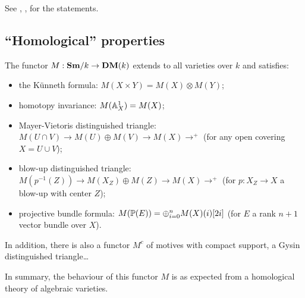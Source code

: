 See \cite[2.2]{voevodsky00-mm}, \cite[14]{MVW-motcoh},
\cite[18]{andre04-motifs} for the statements.


\subsection{``Homological'' properties}

\begin{thm}
  The functor $M:\mathbf{Sm}/k\to\mathbf{DM}(k)$ extends to all varieties over $k$ and
  satisfies:
  \begin{itemize}
  \item the Künneth formula: $M(X\times Y)= M(X)\otimes M(Y)$;
  \item homotopy invariance: $M(\mathbb{A}^{1}_{X})=M(X)$;
  \item Mayer-Vietoris distinguished triangle: $M(U\cap V)\to
    M(U)\oplus M(V)\to M(X)\to^{+}$ (for any open covering $X=U\cup
    V$);
  \item blow-up distinguished triangle: $M(p^{-1}(Z))\to
    M(X_{Z})\oplus M(Z)\to M(X)\to^{+}$ (for $p:X_{Z}\to X$ a blow-up
    with center $Z$);
  \item projective bundle formula:
    $M(\mathbb{P}(E))=\oplus_{i=0}^{n}M(X)(i)[2i]$ (for $E$ a rank $n+1$
    vector bundle over $X$).
  \end{itemize}
  In addition, there is also a functor $M^{c}$ of motives with compact
  support, a Gysin distinguished triangle\ldots{}
\end{thm}

In summary, the behaviour of this functor $M$ is as expected from a
homological theory of algebraic varieties. 

